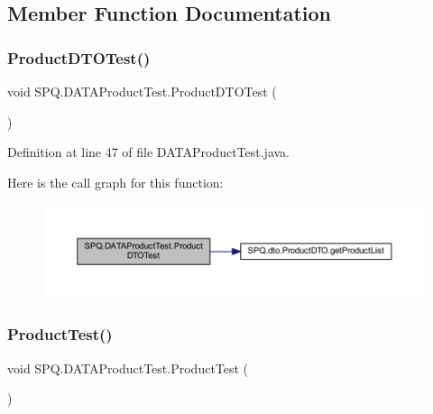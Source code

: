 \subsection{Member Function Documentation}
\mbox{\label{class_s_p_q_1_1_d_a_t_a_product_test_a572f5f092c734feea3c7d8767b4a86c5}} 
\subsubsection{\texorpdfstring{Product\+D\+T\+O\+Test()}{ProductDTOTest()}}
{\footnotesize\ttfamily void S\+P\+Q.\+D\+A\+T\+A\+Product\+Test.\+Product\+D\+T\+O\+Test (\begin{DoxyParamCaption}{ }\end{DoxyParamCaption})}



Definition at line 47 of file D\+A\+T\+A\+Product\+Test.\+java.

Here is the call graph for this function\+:\nopagebreak
\begin{figure}[H]
\begin{center}
\leavevmode
\includegraphics[width=350pt]{class_s_p_q_1_1_d_a_t_a_product_test_a572f5f092c734feea3c7d8767b4a86c5_cgraph}
\end{center}
\end{figure}
\mbox{\label{class_s_p_q_1_1_d_a_t_a_product_test_afb49da7389a7f4f42159adf87b4a11be}} 
\subsubsection{\texorpdfstring{Product\+Test()}{ProductTest()}}
{\footnotesize\ttfamily void S\+P\+Q.\+D\+A\+T\+A\+Product\+Test.\+Product\+Test (\begin{DoxyParamCaption}{ }\end{DoxyParamCaption})}



